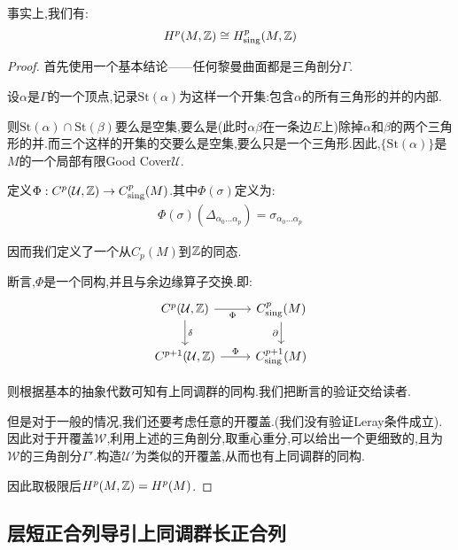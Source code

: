 事实上,我们有:
\begin{align*}
	H^p(M,\mathbb{Z})\cong H^p_{\mathrm{sing}}(M,\mathbb{Z})
\end{align*}
\begin{proof}
	首先使用一个基本结论——任何黎曼曲面都是三角剖分$\Gamma$.

	设$\alpha$是$\Gamma$的一个顶点,记录$\mathrm{St}(\alpha)$为这样一个开集:包含$\alpha$的所有三角形的并的内部.

   则$\mathrm{St}(\alpha)\cap \mathrm{St}(\beta)$要么是空集,要么是(此时$\alpha$$\beta$在一条边$E$上)除掉$\alpha$和$\beta$的两个三角形的并.而三个这样的开集的交要么是空集,要么只是一个三角形.因此,$\{\mathrm{St}(\alpha)\}$是$M$的一个局部有限Good Cover$\mathcal{U}$.

   定义$\Phi:C^p(\mathcal{U},\mathbb{Z}) \to C^p_{\mathrm{sing}}(M)$.其中$\Phi(\sigma)$定义为:
   \begin{align*}
	\Phi(\sigma)(\Delta_{\alpha_0\dots\alpha_p})=\sigma_{\alpha_0\dots\alpha_p}
   \end{align*}

   因而我们定义了一个从$C_p(M)$到$\mathbb{Z}$的同态.

   断言,$\Phi$是一个同构,并且与余边缘算子交换.即:
   \[\begin{tikzcd}
	{C^p(\mathcal{U},\Z)} & {C^p_{\mathrm{sing}}(M)} \\
	{C^{p+1}(\mathcal{U},\Z)} & {C^{p+1}_{\mathrm{sing}}(M)}
	\arrow["\Phi"', from=1-1, to=1-2]
	\arrow["\delta", from=1-1, to=2-1]
	\arrow["\partial"', from=1-2, to=2-2]
	\arrow["\Phi", from=2-1, to=2-2]
\end{tikzcd}\]

则根据基本的抽象代数可知有上同调群的同构.我们把断言的验证交给读者.

但是对于一般的情况,我们还要考虑任意的开覆盖.(我们没有验证Leray条件成立).因此对于开覆盖$\mathcal{W}$,利用上述的三角剖分,取重心重分,可以给出一个更细致的,且为$\mathcal{W}$的三角剖分$\Gamma'$.构造$\mathcal{U}'$为类似的开覆盖,从而也有上同调群的同构.

因此取极限后$H^p(M,\mathbb{Z})=H^p(M)$.
\end{proof}
\subsection*{层短正合列导引上同调群长正合列}

